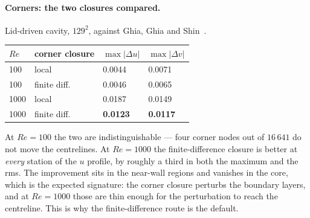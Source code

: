 \documentclass[11pt,a4paper]{article}
\begin{document}
\paragraph{Corners: the two closures compared.} Lid-driven cavity, $129^2$,
against Ghia, Ghia and Shin~\cite{ghia1982}.
\begin{center}\small
\begin{tabular}{llll}
\toprule
$Re$ & corner closure & $\max|\Delta u|$ & $\max|\Delta v|$ \\
\midrule
100  & local        & 0.0044 & 0.0071 \\
100  & finite diff. & 0.0046 & 0.0065 \\
1000 & local        & 0.0187 & 0.0149 \\
1000 & finite diff. & \textbf{0.0123} & \textbf{0.0117} \\
\bottomrule
\end{tabular}
\end{center}
\noindent At $Re=100$ the two are indistinguishable --- four corner nodes out of
$16\,641$ do not move the centrelines. At $Re=1000$ the finite-difference closure
is better at \emph{every} station of the $u$ profile, by roughly a third in both
the maximum and the rms. The improvement sits in the near-wall regions and
vanishes in the core, which is the expected signature: the corner closure
perturbs the boundary layers, and at $Re=1000$ those are thin enough for the
perturbation to reach the centreline. This is why the finite-difference route is
the default.
\end{document}
